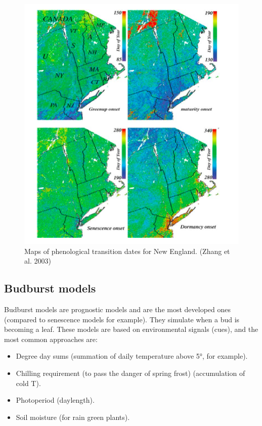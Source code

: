 \documentclass[
  12pt,
  oneside]{book}
\providecommand{\tightlist}{%
  \setlength{\itemsep}{0pt}\setlength{\parskip}{0pt}}
\begin{document}
\begin{figure}

{\centering \includegraphics[width=0.8\linewidth]{figures/chap4/f45_zhang_map} 

}

\caption{Maps of phenological transition dates for New England. (Zhang et al. 2003)}\label{fig:f45}
\end{figure}

\hypertarget{budburst-models}{%
\subsection{Budburst models}\label{budburst-models}}

Budburst models are prognostic models and are the most developed ones (compared to senescence models for example). They simulate when a bud is becoming a leaf. These models are based on environmental signals (cues), and the most common approaches are:

\begin{itemize}
\tightlist
\item
  Degree day sums (summation of daily temperature above 5°, for example).
\item
  Chilling requirement (to pass the danger of spring frost) (accumulation of cold T).
\item
  Photoperiod (daylength).
\item
  Soil moisture (for rain green plants).
\end{itemize}
\end{document}
